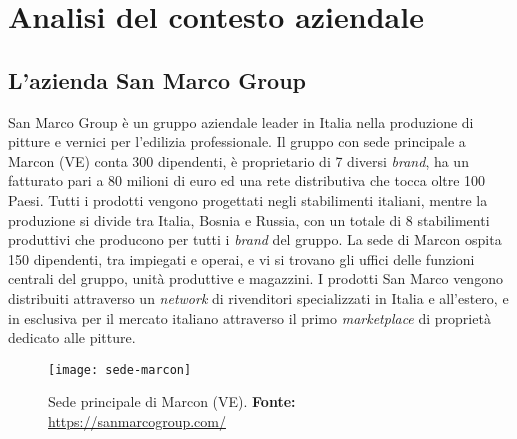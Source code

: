 
\chapter{Analisi del contesto aziendale}
\label{cap:analisi-del-contesto-aziendale}





\section{L'azienda San Marco Group}

San Marco Group è un gruppo aziendale leader in Italia nella produzione di pitture e vernici per l'edilizia professionale. Il gruppo con sede principale a Marcon (VE) conta 300 dipendenti, è proprietario di 7 diversi \textit{brand}, ha un fatturato pari a 80 milioni di euro ed una rete distributiva che tocca oltre 100 Paesi. Tutti i prodotti vengono progettati negli stabilimenti italiani, mentre la produzione si divide tra Italia, Bosnia e Russia, con un totale di 8 stabilimenti produttivi che producono per tutti i \textit{brand} del gruppo. La sede di Marcon ospita 150 dipendenti, tra impiegati e operai, e vi si trovano gli uffici delle funzioni centrali del gruppo, unità produttive e magazzini. I prodotti San Marco vengono distribuiti attraverso un \textit{network} di rivenditori specializzati in Italia e all'estero, e in esclusiva per il mercato italiano attraverso il primo \textit{marketplace} di proprietà dedicato alle pitture.

\vspace{10pt}
\begin{figure}[htbp]
	\begin{center}
		\texttt{[image: sede-marcon]}
		\caption{Sede principale di Marcon (VE). \newline \textbf{Fonte: }\url{https://sanmarcogroup.com/}}
	\end{center}
\end{figure}
\vspace{10pt}


